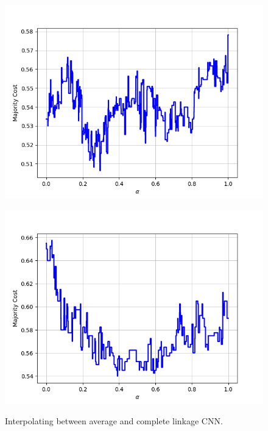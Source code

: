 \begin{figure}[h]
\begin{minipage}{.19\textwidth}
  {\includegraphics[width=\linewidth]{plots/omniglot-intra-ac-cnn/Tagalog}}
\end{minipage}
\begin{minipage}{.19\textwidth}
  \centering
  {\includegraphics[width=\linewidth]{plots/omniglot-intra-ac-cnn/Tifinagh}}
\end{minipage}
\caption{%
  Interpolating between average and complete linkage CNN.}
\label{}
\end{figure}

